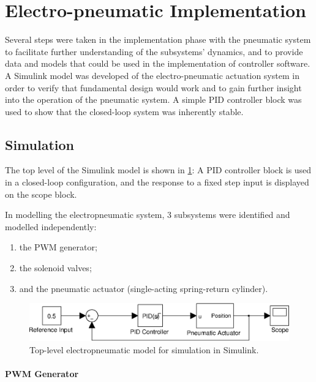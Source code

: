 \section{Electro-pneumatic Implementation\label{sec:electropneumatic_implementation}}

Several steps were taken in the implementation phase with the pneumatic system to facilitate further understanding of the subsystems' dynamics, and to provide data and models that could be used in the implementation of controller software. A Simulink model was developed of the electro-pneumatic actuation system in order to verify that fundamental design would work and to gain further insight into the operation of the pneumatic system. A simple PID controller block was used to show that the closed-loop system was inherently stable.

\subsection{Simulation}

The top level of the Simulink model is shown in \ref{fig:pneumatics_top_level}: A PID controller block is used in a closed-loop configuration, and the response to a fixed step input is displayed on the scope block.

In modelling the electropneumatic system, 3 subsystems were identified and modelled independently:

\begin{enumerate}
  \item the PWM generator;
  \item the solenoid valves;
  \item and the pneumatic actuator (single-acting spring-return cylinder).
\end{enumerate}

\begin{figure}[h]
\centering
\includegraphics[scale=1]{implementation/figures/pneumatic_modelling1.eps}
\caption{Top-level electropneumatic model for simulation in Simulink.}
\label{fig:pneumatics_top_level}
\end{figure}

\paragraph{PWM Generator}

